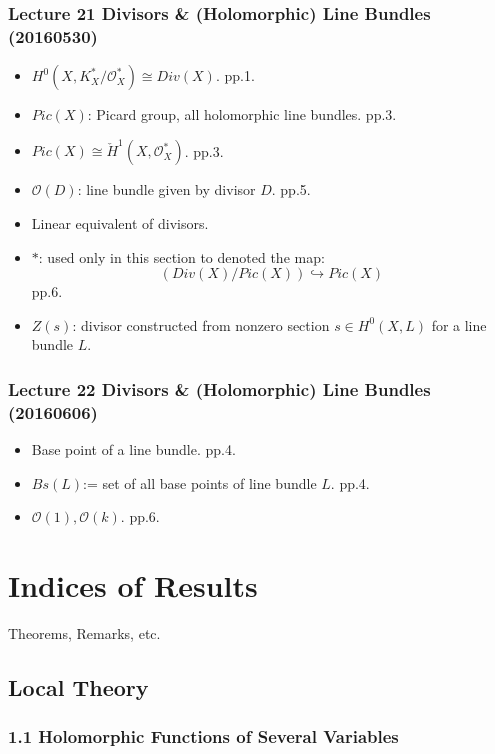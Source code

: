 \documentclass{book}
\numberwithin{equation}{subsection} %
\theoremstyle{definition}
\begin{document}
\section{Lecture 21 Divisors \& (Holomorphic) Line Bundles  (20160530)}
\begin{itemize}
    \item $H^0(X,K^*_X/\mathcal{O}^*_X) \cong Div(X)$. pp.1.
    \item $Pic(X)$: Picard group, all holomorphic line bundles. pp.3.
    \item $Pic(X) \cong \check{H}^1(X,\mathcal{O}^*_X)$. pp.3.
    \item $\mathcal{O}(D)$: line bundle given by divisor $D$. pp.5.
    \item Linear equivalent of divisors.
    \item $*$: used only in this section to denoted the map:
    $$\left( Div(X)/Pic(X) \right) \hookrightarrow Pic(X)$$
    pp.6.
    \item $Z(s)$: divisor constructed from nonzero section $s\in H^0(X,L)$ for a line bundle $L$.
\end{itemize}

\section{Lecture 22 Divisors \& (Holomorphic) Line Bundles (20160606)}
\begin{itemize}
    \item Base point of a line bundle. pp.4.
    \item $Bs(L)$:= set of all base points of line bundle $L$. pp.4.
    \item $\mathcal{O}(1), \mathcal{O}(k)$. pp.6.
\end{itemize}


\part{Indices of Results}

{Theorems, Remarks, etc.}
\chapter{Local Theory}
\label{chap:Local Theory}

\section{1.1 Holomorphic Functions of Several Variables}
\label{sec:book_1.1}
\end{document}
